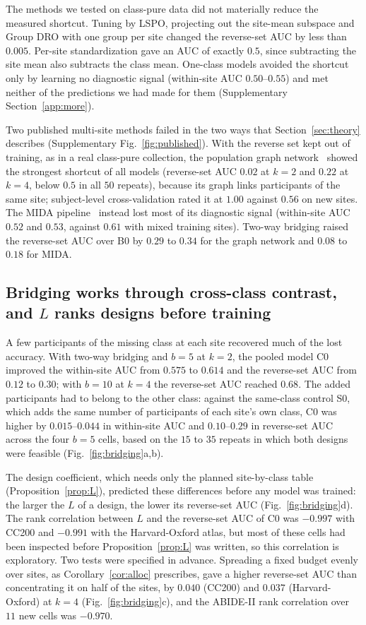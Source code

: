 The methods we tested on class-pure data did not materially reduce the measured shortcut. Tuning by LSPO, projecting out the site-mean subspace and Group DRO with one group per site changed the reverse-set AUC by less than $0.005$. Per-site standardization gave an AUC of exactly $0.5$, since subtracting the site mean also subtracts the class mean. One-class models avoided the shortcut only by learning no diagnostic signal (within-site AUC $0.50$--$0.55$) and met neither of the predictions we had made for them (Supplementary Section~\ref{app:more}).

Two published multi-site methods failed in the two ways that Section~\ref{sec:theory} describes (Supplementary Fig.~\ref{fig:published}). With the reverse set kept out of training, as in a real class-pure collection, the population graph network~\cite{parisot2018} showed the strongest shortcut of all models (reverse-set AUC $0.02$ at $k=2$ and $0.22$ at $k=4$, below $0.5$ in all $50$ repeats), because its graph links participants of the same site; subject-level cross-validation rated it at $1.00$ against $0.56$ on new sites. The MIDA pipeline~\cite{kunda2023} instead lost most of its diagnostic signal (within-site AUC $0.52$ and $0.53$, against $0.61$ with mixed training sites). Two-way bridging raised the reverse-set AUC over B0 by $0.29$ to $0.34$ for the graph network and $0.08$ to $0.18$ for MIDA.


\subsection{Bridging works through cross-class contrast, and $L$ ranks designs before training}\label{sec:res-bridge}

A few participants of the missing class at each site recovered much of the lost accuracy. With two-way bridging and $b=5$ at $k=2$, the pooled model C0 improved the within-site AUC from $0.575$ to $0.614$ and the reverse-set AUC from $0.12$ to $0.30$; with $b=10$ at $k=4$ the reverse-set AUC reached $0.68$. The added participants had to belong to the other class: against the same-class control S0, which adds the same number of participants of each site's own class, C0 was higher by $0.015$--$0.044$ in within-site AUC and $0.10$--$0.29$ in reverse-set AUC across the four $b=5$ cells, based on the $15$ to $35$ repeats in which both designs were feasible (Fig.~\ref{fig:bridging}a,b).

The design coefficient, which needs only the planned site-by-class table (Proposition~\ref{prop:L}), predicted these differences before any model was trained: the larger the $L$ of a design, the lower its reverse-set AUC (Fig.~\ref{fig:bridging}d). The rank correlation between $L$ and the reverse-set AUC of C0 was $-0.997$ with CC200 and $-0.991$ with the Harvard-Oxford atlas, but most of these cells had been inspected before Proposition~\ref{prop:L} was written, so this correlation is exploratory. Two tests were specified in advance. Spreading a fixed budget evenly over sites, as Corollary~\ref{cor:alloc} prescribes, gave a higher reverse-set AUC than concentrating it on half of the sites, by $0.040$ (CC200) and $0.037$ (Harvard-Oxford) at $k=4$ (Fig.~\ref{fig:bridging}c), and the ABIDE-II rank correlation over $11$ new cells was $-0.970$.

